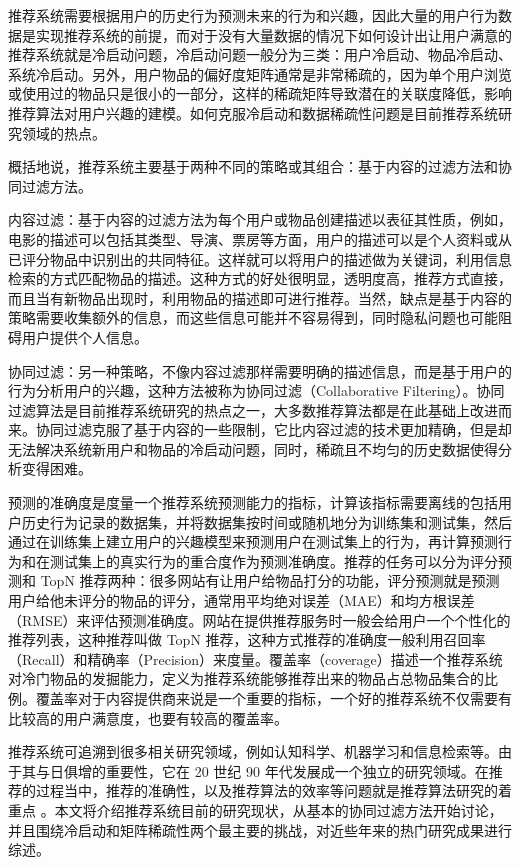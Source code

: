 推荐系统需要根据用户的历史行为预测未来的行为和兴趣，因此大量的用户行为数据是实现推荐系统的前提，而对于没有大量数据的情况下如何设计出让用户满意的推荐系统就是冷启动问题，冷启动问题一般分为三类：用户冷启动、物品冷启动、系统冷启动。另外，用户物品的偏好度矩阵通常是非常稀疏的，因为单个用户浏览或使用过的物品只是很小的一部分，这样的稀疏矩阵导致潜在的关联度降低，影响推荐算法对用户兴趣的建模。如何克服冷启动和数据稀疏性问题是目前推荐系统研究领域的热点。

概括地说，推荐系统主要基于两种不同的策略或其组合：基于内容的过滤方法和协同过滤方法。

内容过滤：基于内容的过滤方法为每个用户或物品创建描述以表征其性质，例如，电影的描述可以包括其类型、导演、票房等方面，用户的描述可以是个人资料或从已评分物品中识别出的共同特征。这样就可以将用户的描述做为关键词，利用信息检索的方式匹配物品的描述。这种方式的好处很明显，透明度高，推荐方式直接，而且当有新物品出现时，利用物品的描述即可进行推荐。当然，缺点是基于内容的策略需要收集额外的信息，而这些信息可能并不容易得到，同时隐私问题也可能阻碍用户提供个人信息。

协同过滤：另一种策略，不像内容过滤那样需要明确的描述信息，而是基于用户的行为分析用户的兴趣，这种方法被称为协同过滤（Collaborative Filtering）。协同过滤算法是目前推荐系统研究的热点之一，大多数推荐算法都是在此基础上改进而来。协同过滤克服了基于内容的一些限制，它比内容过滤的技术更加精确，但是却无法解决系统新用户和物品的冷启动问题，同时，稀疏且不均匀的历史数据使得分析变得困难。

预测的准确度是度量一个推荐系统预测能力的指标，计算该指标需要离线的包括用户历史行为记录的数据集，并将数据集按时间或随机地分为训练集和测试集，然后通过在训练集上建立用户的兴趣模型来预测用户在测试集上的行为，再计算预测行为和在测试集上的真实行为的重合度作为预测准确度。推荐的任务可以分为评分预测和 TopN 推荐两种：很多网站有让用户给物品打分的功能，评分预测就是预测用户给他未评分的物品的评分，通常用平均绝对误差（MAE）和均方根误差（RMSE）来评估预测准确度\cite{王国霞2012个性化推荐系统综述}。网站在提供推荐服务时一般会给用户一个个性化的推荐列表，这种推荐叫做 TopN 推荐，这种方式推荐的准确度一般利用召回率（Recall）和精确率（Precision）来度量。覆盖率（coverage）描述一个推荐系统对冷门物品的发掘能力，定义为推荐系统能够推荐出来的物品占总物品集合的比例。覆盖率对于内容提供商来说是一个重要的指标，一个好的推荐系统不仅需要有比较高的用户满意度，也要有较高的覆盖率。

推荐系统可追溯到很多相关研究领域，例如认知科学、机器学习和信息检索等。由于其与日俱增的重要性，它在 20 世纪 90 年代发展成一个独立的研究领域。在推荐的过程当中，推荐的准确性，以及推荐算法的效率等问题就是推荐算法研究的着重点 \cite{肖力涛2016基于隐式因子和隐式主题的跨域推荐算法研究}。本文将介绍推荐系统目前的研究现状，从基本的协同过滤方法开始讨论，并且围绕冷启动和矩阵稀疏性两个最主要的挑战，对近些年来的热门研究成果进行综述。




